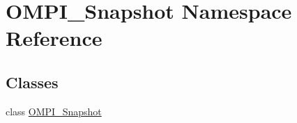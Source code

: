 \hypertarget{namespace_o_m_p_i___snapshot}{\section{O\-M\-P\-I\-\_\-\-Snapshot Namespace Reference}
\label{namespace_o_m_p_i___snapshot}
}
\subsection*{Classes}
\begin{DoxyCompactItemize}
\item 
class \hyperlink{class_o_m_p_i___snapshot_1_1_o_m_p_i___snapshot}{O\-M\-P\-I\-\_\-\-Snapshot}
\end{DoxyCompactItemize}
